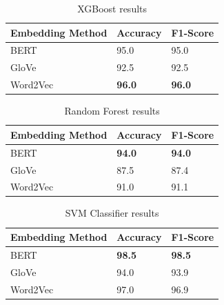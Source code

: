 \begin{table}[hbt!]
\begin{threeparttable}
\caption{XGBoost results}
\label{xgb_results}
\begin{tabular}{lll}
\toprule
\headrow Embedding Method & Accuracy & F1-Score\\
\midrule
BERT & 95.0 & 95.0 \\ 
GloVe & 92.5 & 92.5 \\ 
Word2Vec & \textbf{96.0} & \textbf{96.0} \\ 
\bottomrule
\end{tabular}
\end{threeparttable}
\end{table}

\begin{table}[hbt!]
\begin{threeparttable}
\caption{Random Forest results}
\label{rf_results}
\begin{tabular}{lll}
\toprule
\headrow Embedding Method & Accuracy & F1-Score\\
\midrule
BERT & \textbf{94.0} & \textbf{94.0} \\ 
GloVe & 87.5 & 87.4 \\ 
Word2Vec & 91.0 & 91.1 \\ 
\bottomrule
\end{tabular}
\end{threeparttable}
\end{table}

\begin{table}[hbt!]
\begin{threeparttable}
\caption{SVM Classifier results}
\label{svc_results}
\begin{tabular}{lll}
\toprule
\headrow Embedding Method & Accuracy & F1-Score\\
\midrule
BERT & \textbf{98.5} & \textbf{98.5} \\ 
GloVe & 94.0 & 93.9 \\ 
Word2Vec & 97.0 & 96.9 \\ 
\bottomrule
\end{tabular}
\end{threeparttable}
\end{table}

